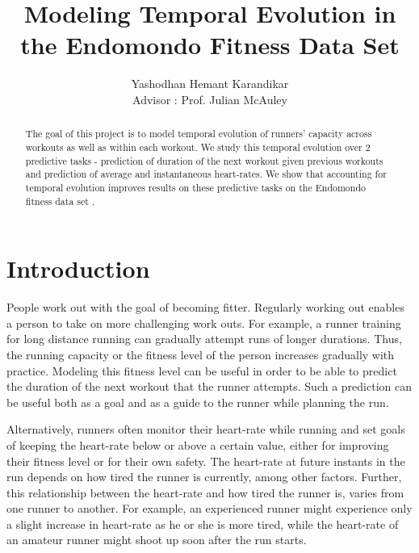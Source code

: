 \documentclass{acm_proc_article-sp}
\begin{document}
\title{Modeling Temporal Evolution in the Endomondo Fitness Data Set}
%
%
\author{
\alignauthor
Yashodhan Hemant Karandikar\\
\bigskip
       {Advisor : Prof. Julian McAuley}
}


\maketitle
\begin{abstract}
The goal of this project is to model temporal evolution of runners' capacity across workouts as well as within each workout. We study this temporal evolution over 2 predictive tasks - prediction of duration of the next workout given previous workouts and prediction of average and instantaneous heart-rates. We show that accounting for temporal evolution improves results on these predictive tasks on the Endomondo fitness data set \cite{endomondo}.
\end{abstract}

\section{Introduction}
People work out with the goal of becoming fitter. Regularly working out enables a person to take on more challenging work outs. For example, a runner training for long distance running can gradually attempt runs of longer durations. Thus, the running capacity or the fitness level of the person increases gradually with practice. Modeling this fitness level can be useful in order to be able to predict the duration of the next workout that the runner attempts. Such a prediction can be useful both as a goal and as a guide to the runner while planning the run.

Alternatively, runners often monitor their heart-rate while running and set goals of keeping the heart-rate below or above a certain value, either for improving their fitness level or for their own safety. The heart-rate at future instants in the run depends on how tired the runner is currently, among other factors. Further, this relationship between the heart-rate and how tired the runner is, varies from one runner to another. For example, an experienced runner might experience only a slight increase in heart-rate as he or she is more tired, while the heart-rate of an amateur runner might shoot up soon after the run starts.
\end{document}
